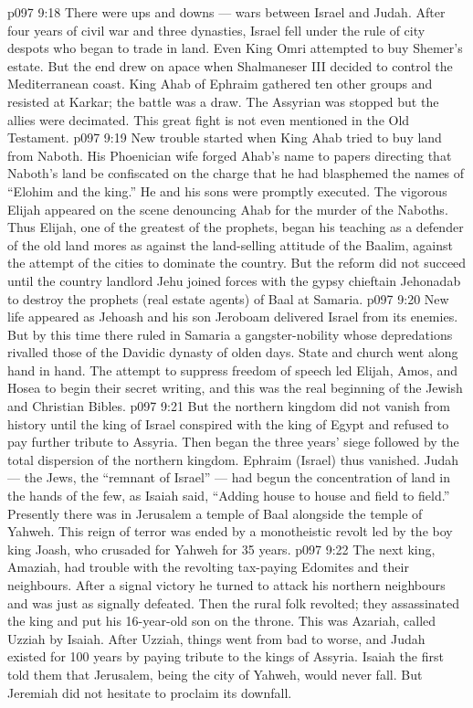 \vs p097 9:18 There were ups and downs --- wars between Israel and Judah. After four years of civil war and three dynasties, Israel fell under the rule of city despots who began to trade in land. Even King Omri attempted to buy Shemer’s estate. But the end drew on apace when Shalmaneser III decided to control the Mediterranean coast. King Ahab of Ephraim gathered ten other groups and resisted at Karkar; the battle was a draw. The Assyrian was stopped but the allies were decimated. This great fight is not even mentioned in the Old Testament.
\vs p097 9:19 New trouble started when King Ahab tried to buy land from Naboth. His Phoenician wife forged Ahab’s name to papers directing that Naboth’s land be confiscated on the charge that he had blasphemed the names of “Elohim and the king.” He and his sons were promptly executed. The vigorous Elijah appeared on the scene denouncing Ahab for the murder of the Naboths. Thus Elijah, one of the greatest of the prophets, began his teaching as a defender of the old land mores as against the land\hyp{}selling attitude of the Baalim, against the attempt of the cities to dominate the country. But the reform did not succeed until the country landlord Jehu joined forces with the gypsy chieftain Jehonadab to destroy the prophets (real estate agents) of Baal at Samaria.
\vs p097 9:20 \pc New life appeared as Jehoash and his son Jeroboam delivered Israel from its enemies. But by this time there ruled in Samaria a gangster\hyp{}nobility whose depredations rivalled those of the Davidic dynasty of olden days. State and church went along hand in hand. The attempt to suppress freedom of speech led Elijah, Amos, and Hosea to begin their secret writing, and this was the real beginning of the Jewish and Christian Bibles.
\vs p097 9:21 \pc But the northern kingdom did not vanish from history until the king of Israel conspired with the king of Egypt and refused to pay further tribute to Assyria. Then began the three years’ siege followed by the total dispersion of the northern kingdom. Ephraim (Israel) thus vanished. Judah --- the Jews, the “remnant of Israel” --- had begun the concentration of land in the hands of the few, as Isaiah said, “Adding house to house and field to field.” Presently there was in Jerusalem a temple of Baal alongside the temple of Yahweh. This reign of terror was ended by a monotheistic revolt led by the boy king Joash, who crusaded for Yahweh for 35 years.
\vs p097 9:22 The next king, Amaziah, had trouble with the revolting tax\hyp{}paying Edomites and their neighbours. After a signal victory he turned to attack his northern neighbours and was just as signally defeated. Then the rural folk revolted; they assassinated the king and put his 16\hyp{}year\hyp{}old son on the throne. This was Azariah, called Uzziah by Isaiah. After Uzziah, things went from bad to worse, and Judah existed for 100 years by paying tribute to the kings of Assyria. Isaiah the first told them that Jerusalem, being the city of Yahweh, would never fall. But Jeremiah did not hesitate to proclaim its downfall.
